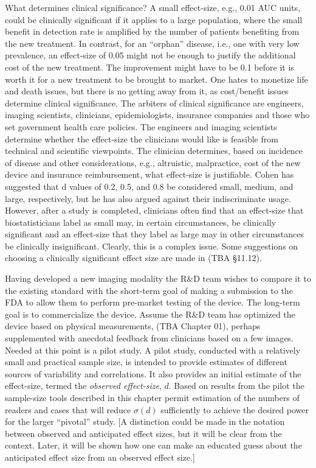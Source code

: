 \documentclass[
]{book}
\begin{document}
What determines clinical significance? A small effect-size, e.g., 0.01 AUC units, could be clinically significant if it applies to a large population, where the small benefit in detection rate is amplified by the number of patients benefiting from the new treatment. In contrast, for an ``orphan'' disease, i.e., one with very low prevalence, an effect-size of 0.05 might not be enough to justify the additional cost of the new treatment. The improvement might have to be 0.1 before it is worth it for a new treatment to be brought to market. One hates to monetize life and death issues, but there is no getting away from it, as cost/benefit issues determine clinical significance. The arbiters of clinical significance are engineers, imaging scientists, clinicians, epidemiologists, insurance companies and those who set government health care policies. The engineers and imaging scientists determine whether the effect-size the clinicians would like is feasible from technical and scientific viewpoints. The clinician determines, based on incidence of disease and other considerations, e.g., altruistic, malpractice, cost of the new device and insurance reimbursement, what effect-size is justifiable. Cohen has suggested that d values of 0.2, 0.5, and 0.8 be considered small, medium, and large, respectively, but he has also argued against their indiscriminate usage. However, after a study is completed, clinicians often find that an effect-size that biostatisticians label as small may, in certain circumstances, be clinically significant and an effect-size that they label as large may in other circumstances be clinically insignificant. Clearly, this is a complex issue. Some suggestions on choosing a clinically significant effect size are made in (TBA §11.12).

Having developed a new imaging modality the R\&D team wishes to compare it to the existing standard with the short-term goal of making a submission to the FDA to allow them to perform pre-market testing of the device. The long-term goal is to commercialize the device. Assume the R\&D team has optimized the device based on physical measurements, (TBA Chapter 01), perhaps supplemented with anecdotal feedback from clinicians based on a few images. Needed at this point is a pilot study. A pilot study, conducted with a relatively small and practical sample size, is intended to provide estimates of different sources of variability and correlations. It also provides an initial estimate of the effect-size, termed the \emph{observed effect-size}, \(d\). Based on results from the pilot the sample-size tools described in this chapter permit estimation of the numbers of readers and cases that will reduce \(\sigma(d)\) sufficiently to achieve the desired power for the larger ``pivotal'' study. {[}A distinction could be made in the notation between observed and anticipated effect sizes, but it will be clear from the context. Later, it will be shown how one can make an educated guess about the anticipated effect size from an observed effect size.{]}
\end{document}
